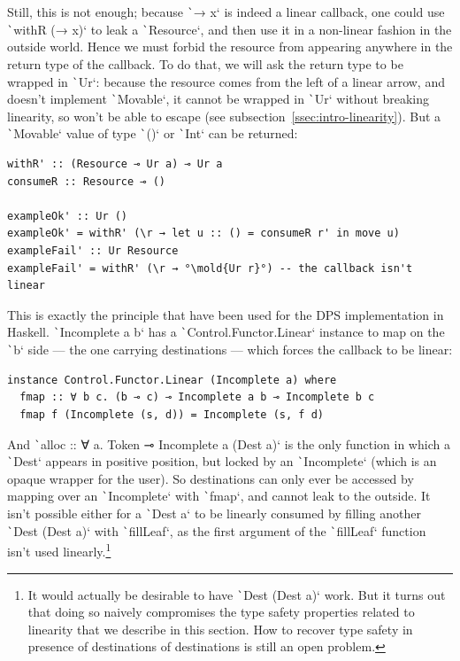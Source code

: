\documentclass[english]{jflart}
\newcommand{\mold}[1]{\colorbox{red}{#1}}
\begin{document}
Still, this is not enough; because \texttt`\x → x` is indeed a linear callback, one could use \texttt`withR (\x → x)` to leak a \texttt`Resource`, and then use it in a non-linear fashion in the outside world. Hence we must forbid the resource from appearing anywhere in the return type of the callback. To do that, we will ask the return type to be wrapped in \texttt`Ur`: because the resource comes from the left of a linear arrow, and doesn't implement \texttt`Movable`, it cannot be wrapped in \texttt`Ur` without breaking linearity, so won't be able to escape (see subsection~\ref{ssec:intro-linearity}). But a \texttt`Movable` value of type \texttt`()` or \texttt`Int` can be returned:
{\small
\begin{verbatim}
withR' :: (Resource ⊸ Ur a) ⊸ Ur a
consumeR :: Resource ⊸ ()

exampleOk' :: Ur ()
exampleOk' = withR' (\r → let u :: () = consumeR r' in move u)
exampleFail' :: Ur Resource
exampleFail' = withR' (\r → °\mold{Ur r}°) -- the callback isn't linear
\end{verbatim}
}

This is exactly the principle that have been used for the DPS implementation in Haskell. \texttt`Incomplete a b` has a \texttt`Control.Functor.Linear` instance to map on the \texttt`b` side --- the one carrying destinations --- which forces the callback to be linear:

{\small
\begin{verbatim}
instance Control.Functor.Linear (Incomplete a) where
  fmap :: ∀ b c. (b ⊸ c) ⊸ Incomplete a b ⊸ Incomplete b c
  fmap f (Incomplete (s, d)) = Incomplete (s, f d)
\end{verbatim}
}

And \texttt`alloc :: ∀ a. Token ⊸ Incomplete a (Dest a)` is the only function in which a \texttt`Dest` appears in positive position, but locked by an \texttt`Incomplete` (which is an opaque wrapper for the user). So destinations can only ever be accessed by mapping over an \texttt`Incomplete` with \texttt`fmap`, and cannot leak to the outside. It isn't possible either for a \texttt`Dest a` to be linearly consumed by filling another \texttt`Dest (Dest a)` with \texttt`fillLeaf`, as the first argument of the \texttt`fillLeaf` function isn't used linearly.\footnote{It would actually be desirable to have \texttt`Dest (Dest a)` work. But it turns out that doing so naively compromises the type safety properties related to linearity that we describe in this section. How to recover type safety in presence of destinations of destinations is still an open problem.}
\end{document}

